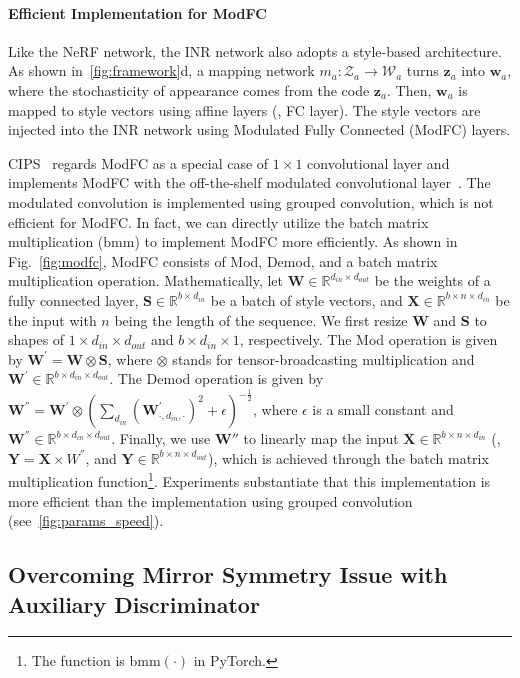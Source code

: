 \documentclass[10pt,twocolumn,letterpaper]{article}
\def\vw{{\bm{w}}}
\def\vz{{\bm{z}}}
\def\mS{{\bm{S}}}
\def\mW{{\bm{W}}}
\def\mX{{\bm{X}}}
\def\mY{{\bm{Y}}}
\newcommand{\R}{\mathbb{R}}
\begin{document}
\paragraph{Efficient Implementation for ModFC}
Like the NeRF network, the INR network also adopts a style-based architecture. As shown in~\cref{fig:framework}d, a mapping network $m_a: \mathcal{Z}_a \rightarrow \mathcal{W}_a$ turns $\vz_a$ into $\vw_a$, where the stochasticity of appearance comes from the code $\vz_a$. Then, $\vw_a$ is mapped to style vectors using affine layers (\ie, FC layer). The style vectors are injected into the INR network using Modulated Fully Connected (ModFC) layers.

CIPS~\cite{anokhin2021Image} regards ModFC as a special case of $1\times1$ convolutional layer and implements ModFC with the off-the-shelf modulated convolutional layer~\cite{karras2019Analyzing}. The modulated convolution is implemented using grouped convolution, which is not efficient for ModFC. In fact, we can directly utilize the batch matrix multiplication ($\mathrm{bmm}$) to implement ModFC more efficiently. As shown in Fig.~\ref{fig:modfc}, ModFC consists of \textsf{Mod}, \textsf{Demod}, and a batch matrix multiplication operation. Mathematically, let $\mW \in \R^{d_{in} \times d_{out}}$ be the weights of a fully connected layer, $\mS \in \R^{b \times d_{in}}$ be a batch of style vectors, and $\mX \in \R^{b \times n \times d_{in}}$ be the input with $n$ being the length of the sequence. We first resize $\mW$ and $\mS$ to shapes of ${1\times d_{in} \times d_{out}}$ and ${b \times d_{in} \times 1}$, respectively. The \textsf{Mod} operation is given by $\mW^{'}=\mW \otimes \mS$, where $\otimes$ stands for tensor-broadcasting multiplication and $\mW^{'} \in \R^{b \times d_{in} \times d_{out}}$. The \textsf{Demod} operation is given by $\mW^{''}=\mW^{'}\otimes \left( \sum_{d_{in}}(\mW^{'}_{\cdot,d_{in},\cdot})^2 + \epsilon \right)^{-\frac{1}{2}}$, where $\epsilon$ is a small constant and $\mW^{''} \in \R^{b \times d_{in} \times d_{out}}$. Finally, we use $\mW{''}$ to linearly map the input $\mX \in \R^{b \times n \times d_{in}}$ (\ie, $\mY = \mX \times W^{''}$, and $\mY \in \R^{b \times n \times d_{out}}$), which is achieved through the batch matrix multiplication function\footnote{The function is $\mathrm{bmm}(\cdot)$ in PyTorch.}. Experiments substantiate that this implementation is more efficient than the implementation using grouped convolution (see~\cref{fig:params_speed}).



\subsection{Overcoming Mirror Symmetry Issue with Auxiliary Discriminator}
\label{sec:mirror_symmetry}
\end{document}
